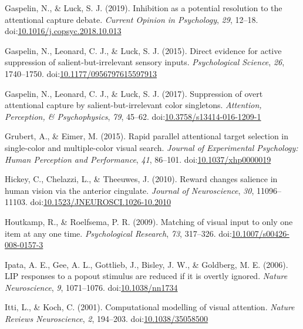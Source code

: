 \documentclass[jou, a4paper, noextraspace,floatsintext]{apa6}
\theoremstyle{definition}
\theoremstyle{definition}
\theoremstyle{definition}
\theoremstyle{remark}
\begin{document}
\hypertarget{ref-Gaspelin2018a}{}
Gaspelin, N., \& Luck, S. J. (2019). Inhibition as a potential
resolution to the attentional capture debate. \emph{Current Opinion in
Psychology}, \emph{29}, 12--18.
doi:\href{https://doi.org/10.1016/j.copsyc.2018.10.013}{10.1016/j.copsyc.2018.10.013}

\hypertarget{ref-Gaspelin2015}{}
Gaspelin, N., Leonard, C. J., \& Luck, S. J. (2015). Direct evidence for
active suppression of salient-but-irrelevant sensory inputs.
\emph{Psychological Science}, \emph{26}, 1740--1750.
doi:\href{https://doi.org/10.1177/0956797615597913}{10.1177/0956797615597913}

\hypertarget{ref-Gaspelin2016}{}
Gaspelin, N., Leonard, C. J., \& Luck, S. J. (2017). Suppression of
overt attentional capture by salient-but-irrelevant color singletons.
\emph{Attention, Perception, \& Psychophysics}, \emph{79}, 45--62.
doi:\href{https://doi.org/10.3758/s13414-016-1209-1}{10.3758/s13414-016-1209-1}

\hypertarget{ref-Grubert2015}{}
Grubert, A., \& Eimer, M. (2015). Rapid parallel attentional target
selection in single-color and multiple-color visual search.
\emph{Journal of Experimental Psychology: Human Perception and
Performance}, \emph{41}, 86--101.
doi:\href{https://doi.org/10.1037/xhp0000019}{10.1037/xhp0000019}

\hypertarget{ref-Hickey2010}{}
Hickey, C., Chelazzi, L., \& Theeuwes, J. (2010). Reward changes
salience in human vision via the anterior cingulate. \emph{Journal of
Neuroscience}, \emph{30}, 11096--11103.
doi:\href{https://doi.org/10.1523/JNEUROSCI.1026-10.2010}{10.1523/JNEUROSCI.1026-10.2010}

\hypertarget{ref-Houtkamp2009}{}
Houtkamp, R., \& Roelfsema, P. R. (2009). Matching of visual input to
only one item at any one time. \emph{Psychological Research}, \emph{73},
317--326.
doi:\href{https://doi.org/10.1007/s00426-008-0157-3}{10.1007/s00426-008-0157-3}

\hypertarget{ref-Ipata2006}{}
Ipata, A. E., Gee, A. L., Gottlieb, J., Bisley, J. W., \& Goldberg, M.
E. (2006). LIP responses to a popout stimulus are reduced if it is
overtly ignored. \emph{Nature Neuroscience}, \emph{9}, 1071--1076.
doi:\href{https://doi.org/10.1038/nn1734}{10.1038/nn1734}

\hypertarget{ref-Itti2001}{}
Itti, L., \& Koch, C. (2001). Computational modelling of visual
attention. \emph{Nature Reviews Neuroscience}, \emph{2}, 194--203.
doi:\href{https://doi.org/10.1038/35058500}{10.1038/35058500}
\end{document}
